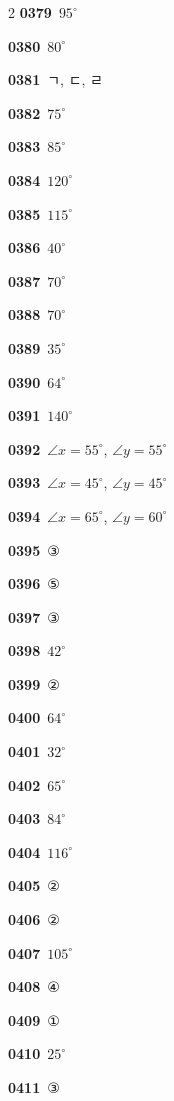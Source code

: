 \documentclass[10pt,a4paper]{article}
\begin{document}
\begin{multicols}{2}
\noindent\textbf{0379}\ $95^\circ$\par
\noindent\textbf{0380}\ $80^\circ$\par
\noindent\textbf{0381}\ ㄱ, ㄷ, ㄹ\par
\noindent\textbf{0382}\ $75^\circ$\par
\noindent\textbf{0383}\ $85^\circ$\par
\noindent\textbf{0384}\ $120^\circ$\par
\noindent\textbf{0385}\ $115^\circ$\par
\noindent\textbf{0386}\ $40^\circ$\par
\noindent\textbf{0387}\ $70^\circ$\par
\noindent\textbf{0388}\ $70^\circ$\par
\noindent\textbf{0389}\ $35^\circ$\par
\noindent\textbf{0390}\ $64^\circ$\par
\noindent\textbf{0391}\ $140^\circ$\par
\noindent\textbf{0392}\ $\angle x=55^\circ$, $\angle y=55^\circ$\par
\noindent\textbf{0393}\ $\angle x=45^\circ$, $\angle y=45^\circ$\par
\noindent\textbf{0394}\ $\angle x=65^\circ$, $\angle y=60^\circ$\par
\noindent\textbf{0395}\ ③\par
\noindent\textbf{0396}\ ⑤\par
\noindent\textbf{0397}\ ③\par
\noindent\textbf{0398}\ $42^\circ$\par
\noindent\textbf{0399}\ ②\par
\noindent\textbf{0400}\ $64^\circ$\par
\noindent\textbf{0401}\ $32^\circ$\par
\noindent\textbf{0402}\ $65^\circ$\par
\noindent\textbf{0403}\ $84^\circ$\par
\noindent\textbf{0404}\ $116^\circ$\par
\noindent\textbf{0405}\ ②\par
\noindent\textbf{0406}\ ②\par
\noindent\textbf{0407}\ $105^\circ$\par
\noindent\textbf{0408}\ ④\par
\noindent\textbf{0409}\ ①\par
\noindent\textbf{0410}\ $25^\circ$\par
\noindent\textbf{0411}\ ③\par

\end{multicols}
\end{document}
